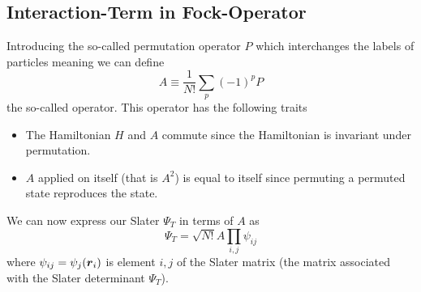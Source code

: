 
\chapter{\label{appendix:A}}

\section{Interaction-Term in Fock-Operator}
        Introducing the so-called permutation operator $P$ which interchanges
        the labels of particles meaning we can define
            \begin{equation}
                A \equiv \frac{1}{N!}\sum_p(-1)^pP
            \end{equation}
        the so-called  operator. This operator has
        the following traits
            \begin{itemize}
                \item The Hamiltonian $H$ and $A$ commute since the Hamiltonian
                    is invariant under permutation.
                \item $A$ applied on itself (that is $A^2$) is equal to itself
                    since permuting a permuted state reproduces the state.
            \end{itemize}
        We can now express our Slater $\Psi_T$ in terms of $A$ as
            \begin{equation}
                \Psi_T = \sqrt{N!}A\prod_{i,j}\psi_{ij}
            \end{equation}
        where $\psi_{ij}=\psi_j(\boldsymbol{{r}}_i)$ is element $i,j$ of the Slater
        matrix (the matrix associated with the Slater determinant $\Psi_T$).

